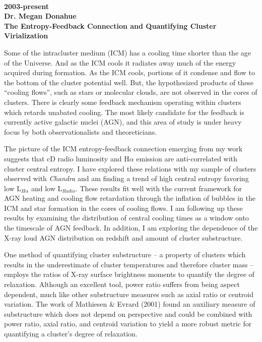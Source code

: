 \documentclass[12pt]{article}
\begin{document}
\begin{singlespace}
\\
{\bf{2003-present}}\\
{\bf{Dr. Megan Donahue}}\\
{\bf{The Entropy-Feedback Connection and Quantifying Cluster Virialization}}
\end{singlespace}
Some of the intracluster medium (ICM) has a cooling time shorter than the age of
the Universe. And as the ICM cools it radiates away much of the energy
acquired during formation. As the ICM cools, portions of it condense
and flow to the bottom of the cluster potential well. But, the
hypothesized products of these ``cooling flows'', such as stars or
molecular clouds, are not observed in the cores of clusters. There is
clearly some feedback mechanism operating within clusters which retards
unabated cooling. The most likely candidate for the feedback is
currently active galactic nuclei (AGN), and this area of study is
under heavy focus by both observationalists and theoreticians.

The picture of the ICM entropy-feedback connection emerging from my
work suggests that cD radio luminosity and H$\alpha$ emission are
anti-correlated with cluster central entropy. I have explored these
relations with my sample of clusters observed with {\textit{Chandra}}
and am finding a trend of high central entropy favoring low
L$_{H\alpha}$ and low L$_{Radio}$. These results fit well with the
current framework for AGN heating and cooling flow retardation through
the inflation of bubbles in the ICM and star formation in the cores of
cooling flows. I am following up these results by examining the
distribution of central cooling times as a window onto the timescale
of AGN feedback. In addition, I am exploring  the dependence of the
X-ray loud AGN distribution on redshift and amount of cluster
substructure.

One method of quantifying cluster substructure -- a property of
clusters which results in the underestimate of cluster temperatures
and therefore cluster mass -- employs the ratios of X-ray surface
brightness moments to quantify the degree of relaxation. Although an
excellent tool, power ratio suffers from being aspect dependent, much
like other substructure measures such as axial ratio or centroid
variation. The work of Mathiesen \& Evrard (2001) found an auxiliary
measure of substructure which does not depend on perspective and could
be combined with power ratio, axial ratio, and centroid variation to
yield a more robust metric for quantifying a cluster's degree of
relaxation.
\end{document}
